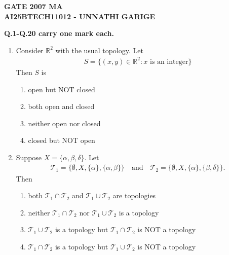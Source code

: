 \documentclass[journal]{IEEEtran}
\numberwithin{equation}{enumi}
\numberwithin{figure}{enumi}
\begin{document}




\begin{center}
    \LARGE \textbf{GATE 2007 MA}\\[0.5em]
    \large \textbf{AI25BTECH11012 - UNNATHI GARIGE}
\end{center}




\begin{center}
 \textbf{Q.1-Q.20 carry one mark each.}
\end{center}
\vspace{0.25em}

\begin{enumerate}
   

\item Consider $\mathbb{R}^2$ with the usual topology. Let 
\begin{align*}
  S = \{(x, y) \in \mathbb{R}^2 : x \text{ is an integer} \}  
\end{align*}
 Then $S$ is  

\hfill{}
\begin{enumerate} 
    \item open but NOT closed
    \item both open and closed
    \item neither open nor closed
    \item closed but NOT open
\end{enumerate}


\item Suppose $X = \{ \alpha, \beta, \delta \}$. Let
\begin{align*}
\mathcal{T}_1 = \{\emptyset, X, \{\alpha\}, \{\alpha, \beta\} \} \quad \text{and} \quad \mathcal{T}_2 = \{\emptyset, X, \{\alpha\}, \{\beta, \delta\} \}.
\end{align*}
Then
\hfill{}
\begin{enumerate}
     \item both $\mathcal{T}_1 \cap \mathcal{T}_2$ and $\mathcal{T}_1 \cup \mathcal{T}_2$ are topologies
    \item neither $\mathcal{T}_1 \cap \mathcal{T}_2$ nor $\mathcal{T}_1 \cup \mathcal{T}_2$ is a topology
    \item $\mathcal{T}_1 \cup \mathcal{T}_2$ is a topology but $\mathcal{T}_1 \cap \mathcal{T}_2$ is NOT a topology
    \item $\mathcal{T}_1 \cap \mathcal{T}_2$ is a topology but $\mathcal{T}_1 \cup \mathcal{T}_2$ is NOT a topology
\end{enumerate}


\end{enumerate}
\end{document}
